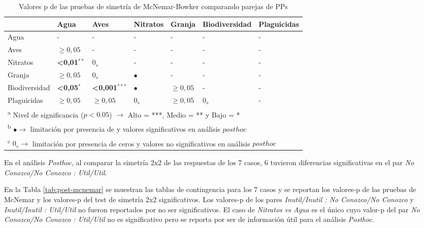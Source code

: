 \documentclass[a4paper, nobind]{templates/ociamthesis}
\begin{document}
\begin{table}

\caption[Comparación de percepeción entre PPs]{\label{tab:mcnemar-politicas}Valores p de las pruebas de simetría de McNemar-Bowker comparando parejas de PPs}
\centering
\begin{tabular}[t]{lllllll}
\toprule
  & Agua & Aves & Nitratos & Granja & Biodiversidad & Plaguicidas\\
\midrule
Agua & - & - & - & - & - & -\\
Aves & $\geq 0,05$ & - & - & - & - & -\\
Nitratos & \textbf{<0,01}$^{**}$ & $0_s$ & - & - & - & -\\
Granja & $\geq 0,05$ & $0_s$ & $\bullet$ & - & - & -\\
Biodiversidad & \textbf{<0,05}$^{*}$ & \textbf{<0,001}$^{***}$ & $\bullet$ & $\geq 0,05$ & - & -\\
\addlinespace
Plaguicidas & $\geq 0,05$ & $\geq 0,05$ & $0_s$ & $\geq 0,05$ & $0_s$ & -\\
\bottomrule
\multicolumn{7}{l}{\textsuperscript{a} Nivel de significancia ($p<0.05$) $\rightarrow$ Alto = ***, Medio = ** y Bajo = *}\\
\multicolumn{7}{l}{\textsuperscript{b} $\bullet \rightarrow$ limitación por presencia de y valores significativos en análisis $posthoc$}\\
\multicolumn{7}{l}{\textsuperscript{c} $0_s \rightarrow$ limitación por presencia de ceros y valores no significativos en análisis $posthoc$}\\
\end{tabular}
\end{table}

En el análisis \emph{Posthoc}, al comparar la simetría 2x2 de las respuestas de los 7 casos, 6 tuvieron diferencias significativas en el par \emph{No Conozco/No Conozco : Util/Util}.

En la Tabla \ref{tab:post-mcnemar} se muestran las tablas de contingencia para los 7 casos y se reportan los valores-p de las pruebas de McNemar y los valores-p del test de simetría 2x2 significativos. Los valores-p de los pares \emph{Inutil/Inutil : No Conozco/No Conozco} y \emph{Inutil/Inutil : Util/Util} no fueron reportados por no ser significativos. El caso de \emph{Nitratos vs Agua} es el único cuyo valor-p del par \emph{No Conozco/No Conozco : Util/Util} no es significativo pero se reporta por ser de información útil para el análisis \emph{Posthoc}.
\end{document}
